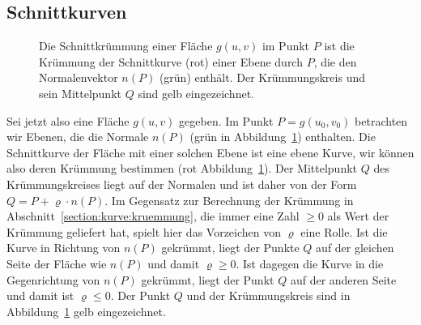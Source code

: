 \subsection{Schnittkurven%
\label{skript:kurven:schnittkurven}}
\begin{figure}
\centering
{}
\caption{Die Schnittkrümmung einer Fläche $g(u,v)$ im Punkt $P$ ist
die Krümmung der Schnittkurve (rot) einer Ebene durch $P$, die den
Normalenvektor $n(P)$ (grün) enthält.
Der Krümmungskreis und sein Mittelpunkt $Q$ sind gelb eingezeichnet.
\label{skript:schnittkruemmung}}
\end{figure}
Sei jetzt also eine Fläche $g(u,v)$ gegeben.
Im Punkt $P=g(u_0,v_0)$ betrachten wir Ebenen, die die Normale $n(P)$
(grün in Abbildung~\ref{skript:schnittkruemmung})
enthalten.
Die Schnittkurve der Fläche mit einer solchen Ebene ist eine ebene
Kurve, wir können also deren Krümmung bestimmen
(rot Abbildung~\ref{skript:schnittkruemmung}).
Der Mittelpunkt $Q$ des Krümmungskreises liegt auf der Normalen
und ist daher von der Form $Q = P + \varrho \cdot n(P)$.
Im Gegensatz zur Berechnung der Krümmung in
Abschnitt~\ref{section:kurve:kruemmung}, die immer eine Zahl $\ge 0$
als Wert der Krümmung geliefert hat, spielt hier das Vorzeichen von
$\varrho$ eine Rolle.
Ist die Kurve in Richtung von $n(P)$ gekrümmt, liegt der Punkte $Q$ auf der
gleichen Seite der Fläche wie $n(P)$ und damit $\varrho\ge 0$.
Ist dagegen die Kurve in die Gegenrichtung von $n(P)$ gekrümmt, liegt der
Punkt $Q$ auf der anderen Seite und damit ist $\varrho\le 0$.
Der Punkt $Q$ und der Krümmungskreis sind in
Abbildung~\ref{skript:schnittkruemmung} gelb eingezeichnet.

